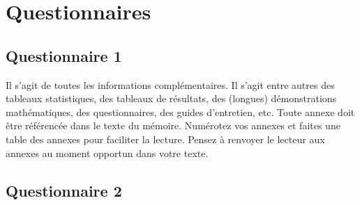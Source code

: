 \chapter{Questionnaires}
\label{chap:questionnaires}

 \section{Questionnaire 1}

 Il s'agit de toutes les informations complémentaires. Il s'agit entre
 autres des tableaux statistiques, des tableaux de résultats, des
 (longues) démonstrations mathématiques, des questionnaires, des
 guides d'entretien, etc. Toute annexe doit être référencée dans le
 texte du mémoire. Numérotez vos annexes et faites une table des
 annexes pour faciliter la lecture. Pensez à renvoyer le lecteur aux
 annexes au moment opportun dans votre texte.

 \section{Questionnaire 2}